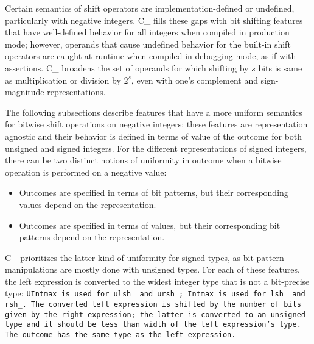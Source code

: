 \def\Subsection#1{\subsection{#1}}

Certain semantics of shift operators are implementation-defined or undefined,
particularly with negative integers.
C\_ fills these gaps with bit shifting features that have
well-defined behavior for all integers when compiled in production mode;
however, operands that cause undefined behavior for the built-in shift operators
are caught at runtime when compiled in debugging mode, as if with assertions.
C\_ broadens the set of operands for which shifting by
$s$ bits is same as multiplication or division by $2^s$,
even with one's complement and sign-magnitude representations.

The following subsections describe features that have a more
uniform semantics for bitwise shift operations on negative integers;
these features are representation agnostic and their behavior is defined
in terms of value of the outcome for both unsigned and signed integers.
For the different representations of signed integers,
there can be two distinct notions of uniformity in outcome
when a bitwise operation is performed on a negative value:

\begin{itemize}[nosep]

\item Outcomes are specified in terms of bit patterns,
but their corresponding values depend on the representation.

\item Outcomes are specified in terms of values,
but their corresponding bit patterns depend on the representation.

\end{itemize}

C\_ prioritizes the latter kind of uniformity for signed types,
as bit pattern manipulations are mostly done with unsigned types.
For each of these features, the left expression is converted
to the widest integer type that is not a bit-precise type:
\tt{UIntmax} is used for \tt{ulsh_} and \tt{ursh_};
\tt{Intmax} is used for \tt{lsh_} and \tt{rsh_}.
The converted left expression is shifted by the number of bits given
by the right expression; the latter is converted to an unsigned type
and it should be less than width of the left expression's type.
The outcome has the same type as the left expression.

